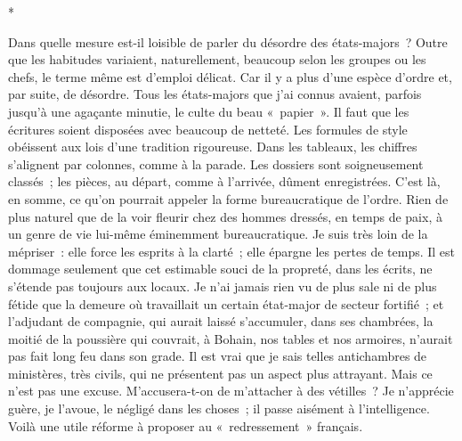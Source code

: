 \documentclass[french,twoside]{book} %
\begin{document}
\begin{center}
*\end{center}
\noindent Dans quelle mesure est-il loisible de parler du désordre des états-majors ? Outre que les habitudes variaient, naturellement, beaucoup selon les groupes ou les chefs, le terme même est d’emploi délicat. Car il y a plus d’une espèce d’ordre et, par suite, de désordre. Tous les états-majors que j’ai connus avaient, parfois jusqu’à une agaçante minutie, le culte du beau « papier ». Il faut que les écritures soient disposées avec beaucoup de netteté. Les formules de style obéissent aux lois d’une tradition rigoureuse. Dans les tableaux, les chiffres s’alignent par colonnes, comme à la parade. Les dossiers sont soigneusement classés ; les pièces, au départ, comme à l’arrivée, dûment enregistrées. C’est là, en somme, ce qu’on pourrait appeler la forme bureaucratique de l’ordre. Rien de plus naturel que de la voir fleurir chez des hommes dressés, en temps de paix, à un genre de vie lui-même éminemment bureaucratique. Je suis très loin de la mépriser : elle force les esprits à la clarté ; elle épargne les pertes de temps. Il est dommage seulement que cet estimable souci de la propreté, dans les écrits, ne s’étende pas toujours aux locaux. Je n’ai jamais rien vu de plus sale ni de plus fétide que la demeure où travaillait un   certain état-major de secteur fortifié ; et l’adjudant de compagnie, qui aurait laissé s’accumuler, dans ses chambrées, la moitié de la poussière qui couvrait, à Bohain, nos tables et nos armoires, n’aurait pas fait long feu dans son grade. Il est vrai que je sais telles antichambres de ministères, très civils, qui ne présentent pas un aspect plus attrayant. Mais ce n’est pas une excuse. M’accusera-t-on de m’attacher à des vétilles ? Je n’apprécie guère, je l’avoue, le négligé dans les choses ; il passe aisément à l’intelligence. Voilà une utile réforme à proposer au « redressement » français.\par
\end{document}
